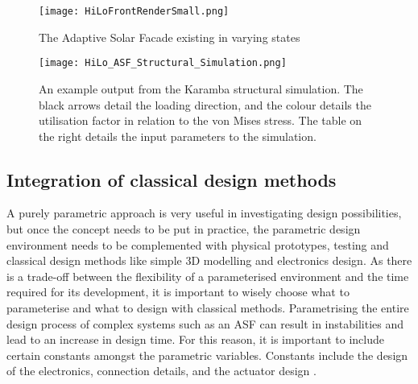 \begin{figure}
\begin{center}
\texttt{[image: HiLoFrontRenderSmall.png]}
\caption{The Adaptive Solar Facade existing in varying states}
\label{fig:structure}
\end{center}
\end{figure}

\begin{figure}
\begin{center}
\texttt{[image: HiLo\_ASF\_Structural\_Simulation.png]}
\caption{An example output from the Karamba structural simulation. The black arrows detail the loading direction, and the colour details the utilisation factor in relation to the von Mises stress. The table on the right details the input parameters to the simulation.}
\label{fig:structureSettings}
\end{center}
\end{figure}




\subsection{Integration of classical design methods}

A purely parametric approach is very useful in investigating design possibilities, but once the concept needs to be put in practice, the parametric design environment needs to be complemented with physical prototypes, testing and classical design methods like simple 3D modelling and electronics design.
As there is a trade-off  between the  flexibility of a parameterised environment and the time required for its development, it is important to wisely choose what to parameterise and what to design with classical methods. Parametrising the entire design process of complex systems such as an ASF can result in instabilities and lead to an increase in design time. For this reason, it is important to include certain constants amongst the parametric variables. Constants include the design of the electronics, connection details, and the actuator design \cite{Svetozarevic2017a,svetozarevic2016soro}.


